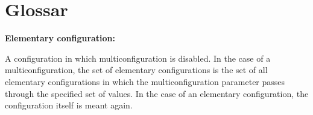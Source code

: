 \documentclass[parskip=full,11pt]{scrartcl}
\begin{document}
\section{Glossar}
\textbf{Elementary configuration:}

A configuration in which multiconfiguration is disabled. In the case of a multiconfiguration, the set of elementary configurations is the set of all elementary configurations in which the multiconfiguration parameter passes through the specified set of values. In the case of an elementary configuration, the configuration itself is meant again.
\end{document}
